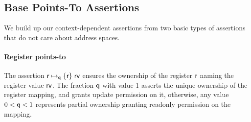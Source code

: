 
\subsection{Base Points-To Assertions}
\label{sec:pointsto}
We build up our context-dependent assertions from two basic types of assertions that do not care about address spaces.

\paragraph{Register points-to} 
The assertion $\mathsf{r}\mapsto_{\mathsf{q}}\{\mathsf{r}\}\;\mathsf{rv}$ ensures the ownership of the register $\mathsf{r}$ naming the register value $\mathsf{rv}$. 
The fraction $\mathsf{q}$ with value 1 asserts the unique ownership of the register mapping, and grants update permission on it, 
otherwise, any value $0 < \mathsf{q} <1$ represents partial ownership granting readonly permission on the mapping.


